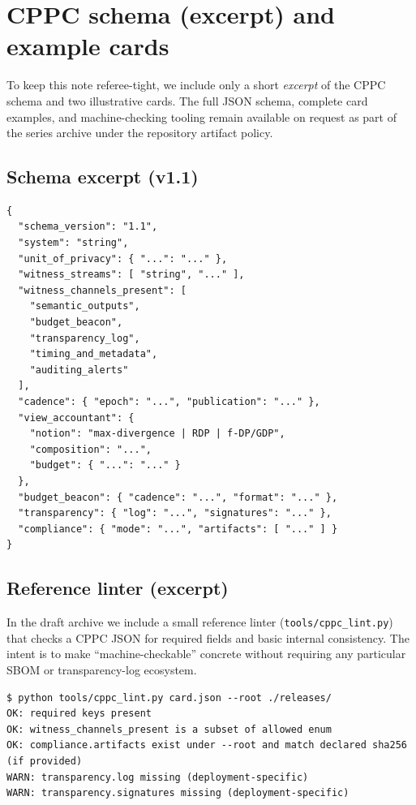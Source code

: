 \documentclass[11pt]{article}
\theoremstyle{definition}
\theoremstyle{remark}
\begin{document}
\section{CPPC schema (excerpt) and example cards}
\label{app:cppc}
To keep this note referee-tight, we include only a short \emph{excerpt} of the CPPC schema and two illustrative cards.
The full JSON schema, complete card examples, and machine-checking tooling remain available on request as part of the series archive under the repository artifact policy.\cite{series:artifactpolicy}

\subsection{Schema excerpt (v1.1)}
\begin{lstlisting}
{
  "schema_version": "1.1",
  "system": "string",
  "unit_of_privacy": { "...": "..." },
  "witness_streams": [ "string", "..." ],
  "witness_channels_present": [
    "semantic_outputs",
    "budget_beacon",
    "transparency_log",
    "timing_and_metadata",
    "auditing_alerts"
  ],
  "cadence": { "epoch": "...", "publication": "..." },
  "view_accountant": {
    "notion": "max-divergence | RDP | f-DP/GDP",
    "composition": "...",
    "budget": { "...": "..." }
  },
  "budget_beacon": { "cadence": "...", "format": "..." },
  "transparency": { "log": "...", "signatures": "..." },
  "compliance": { "mode": "...", "artifacts": [ "..." ] }
}
\end{lstlisting}

\subsection{Reference linter (excerpt)}
In the draft archive we include a small reference linter (\texttt{tools/cppc\_lint.py}) that checks a CPPC JSON for required fields and basic internal consistency.
The intent is to make ``machine-checkable'' concrete without requiring any particular SBOM or transparency-log ecosystem.

\begin{lstlisting}
$ python tools/cppc_lint.py card.json --root ./releases/
OK: required keys present
OK: witness_channels_present is a subset of allowed enum
OK: compliance.artifacts exist under --root and match declared sha256 (if provided)
WARN: transparency.log missing (deployment-specific)
WARN: transparency.signatures missing (deployment-specific)
\end{lstlisting}
\end{document}
